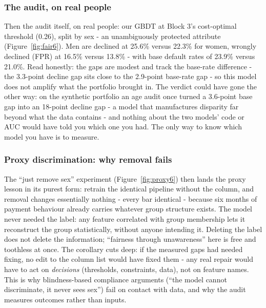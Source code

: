\documentclass[11pt,a4paper]{article}
\begin{document}
\subsubsection{The audit, on real people}
Then the audit itself, on real people: our GBDT at Block 3's
cost-optimal threshold (0.26), split by sex - an unambiguously protected
attribute (Figure~\ref{fig:fair6}). Men are declined at 25.6\% versus
22.3\% for women, wrongly declined (FPR) at 16.5\% versus 13.8\% - with
base default rates of 23.9\% versus 21.0\%. Read honestly: the gaps are
modest and track the base-rate difference - the 3.3-point decline gap
sits close to the 2.9-point base-rate gap - so this model does not
amplify what the portfolio brought in. The verdict could have gone the
other way: on the synthetic portfolio an age audit once turned a
3.6-point base gap into an 18-point decline gap - a model that
manufactures disparity far beyond what the data contains - and nothing
about the two models' code or AUC would have told you which one you
had. The only way to know which model you have is to measure.

\subsubsection{Proxy discrimination: why removal fails}
The ``just remove sex'' experiment (Figure~\ref{fig:proxy6}) then lands
the proxy lesson in its purest form: retrain the identical pipeline
without the column, and removal changes essentially nothing - every bar
identical - because six months of payment behaviour already carries
whatever group structure exists. The model never needed the label: any
feature correlated with group membership lets it reconstruct the group
statistically, without anyone intending it. Deleting the label does not
delete the information; ``fairness through unawareness'' here is free
and toothless at once. The corollary cuts deep: if the measured gaps
had needed fixing, no edit to the column list would have fixed them -
any real repair would have to act on \emph{decisions} (thresholds,
constraints, data), not on feature names. This is why blindness-based
compliance arguments (``the model cannot discriminate, it never sees
sex'') fail on contact with data, and why the audit measures outcomes
rather than inputs.
\end{document}
